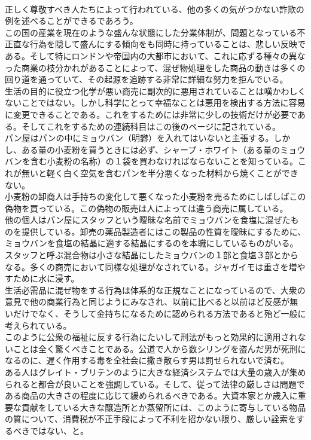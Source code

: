 \documentclass[8pt]{extreport}
\begin{document}
\begin{CJK}{UTF8}{min}
\\	正しく尊敬すべき人たちによって行われている、他の多くの気がつかない詐欺の例を述べることができるであろう。
\\	この国の産業を現在のような盛んな状態にした分業体制が、問題となっている不正直な行為を隠して盛んにする傾向をも同時に持っていることは、悲しい反映である。そして特にロンドンや帝国内の大都市において、これに応ずる種々の異なった商業の枝分かれがあることによって、混ぜ物処理をした商品の動きは多くの回り道を通っていて、その起源を追跡する非常に詳細な努力を拒んでいる。
\\	生活の目的に役立つ化学が悪い商売に副次的に悪用されていることは嘆かわしくないことではない。しかし科学にとって幸福なことは悪用を検出する方法に容易に変更できることである。これをするためには非常に少しの技術だけが必要である。そしてこれをするための連続科目はこの後のページに記されている。
\\	パン屋はパンの中にミョウバン（明礬）を入れてはいないと主張する。しかし、ある量の小麦粉を買うときには必ず、シャープ・ホワイト（ある量のミョウバンを含む小麦粉の名称）の１袋を買わなければならないことを知っている。これが無いと軽く白く空気を含むパンを半分悪くなった材料から焼くことができない。
\\	小麦粉の卸商人は手持ちの変化して悪くなった小麦粉を売るためにしばしばこの偽物を買っている。この偽物の販売は人によっては違う商売に属している。
\\	他の個人はパン屋にスタッフという曖昧な名前でミョウバンを食塩に混ぜたものを提供している。卸売の薬品製造者にはこの製品の性質を曖昧にするために、ミョウバンを食塩の結晶に適する結晶にするのを本職にしているものがいる。スタッフと呼ぶ混合物は小さな結晶にしたミョウバンの１部と食塩３部とからなる。多くの商売において同様な処理がなされている。ジャガイモは重さを増やすために水に浸す。
\\	生活必需品に混ぜ物をする行為は体系的な正規なことになっているので、大衆の意見で他の商業行為と同じようにみなされ、以前に比べると以前ほど反感が無いだけでなく、そうして金持ちになるために認められる方法であると殆ど一般に考えられている。
\\	このように公衆の福祉に反する行為にたいして刑法がもっと効果的に適用されないことは全く驚くべきことである。公道で人から数シリングを盗んだ男が死刑になるのに、遅く作用する毒を全社会に撒き散らす男は罰せられないで済む。
\\	ある人はグレイト・ブリテンのように大きな経済システムでは大量の歳入が集められると都合が良いことを強調している。そして、従って法律の厳しさは問題である商品の大きさの程度に応じて緩められるべきである。大資本家とか歳入に重要な貢献をしている大きな醸造所とか蒸留所には、このように寄与している物品の質について、消費税が不正手段によって不利を招かない限り、厳しい詮索をするべきではない、と。

\end{CJK}
\end{document}
